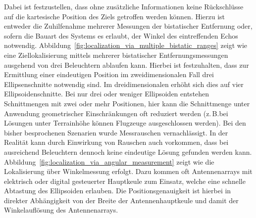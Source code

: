 Dabei ist festzustellen, dass ohne zusätzliche Informationen keine Rückschlüsse auf die kartesische Position des Ziels getroffen werden können. Hierzu ist entweder die Zuhilfenahme mehrerer Messungen der bistatischer Entfernung oder, sofern die Bauart des Systems es erlaubt, der Winkel des eintreffenden Echos notwendig. Abbildung~\ref{fig:localization_via_multiple_bistatic_ranges} zeigt wie eine Ziellokalisierung mittels mehrerer bistatischer Entfernungsmessungen ausgehend von drei Beleuchtern ablaufen kann. Hierbei ist festzuhalten, dass zur Ermittlung einer eindeutigen Position im zweidimensionalen Fall drei Ellipsenschnitte notwendig sind. Im dreidimensionalen erhöht sich dies auf vier Ellipsoidenschnitte. Bei nur drei oder weniger Ellipsoiden entstehen Schnittmengen mit zwei oder mehr Positionen, hier kann die Schnittmenge unter Anwendung geometrischer Einschränkungen oft reduziert werden (z.\,B.\@ bei Lösungen unter Terrainhöhe können Flugzeuge ausgeschlossen werden). Bei den bisher besprochenen Szenarien wurde Messrauschen vernachlässigt. In der Realität kann durch Einwirkung von Rauschen auch vorkommen, dass bei ausreichend Beleuchtern dennoch keine eindeutige Lösung gefunden werden kann. Abbildung~\ref{fig:localization_via_angular_measurement} zeigt wie die Lokalisierung über Winkelmessung erfolgt. Dazu kommen oft Antennenarrays mit elektrisch oder digital gesteuerter Hauptkeule zum Einsatz, welche eine schnelle Abtastung des Ellipsoiden erlauben. Die Positionsgenauigkeit ist hierbei in direkter Abhängigkeit von der Breite der Antennenhauptkeule und damit der Winkelauflösung des Antennenarrays.

